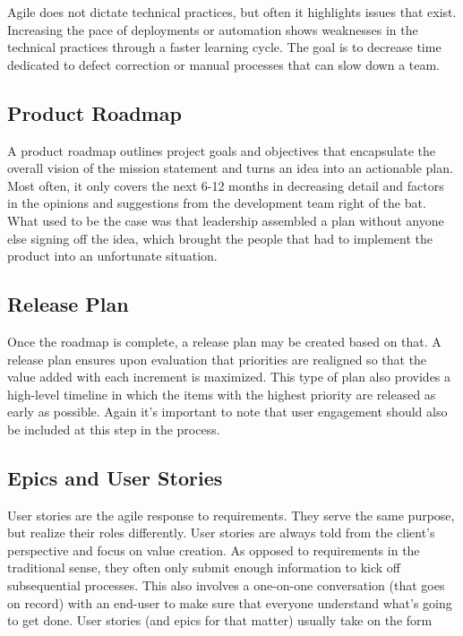 \begin{displaycquote}
	Agile does not dictate technical practices, but often it highlights issues that
	exist. Increasing the pace of deployments or automation shows weaknesses in the
	technical practices through a faster learning cycle. The goal is to decrease time
	dedicated to defect correction or manual processes that can slow down a team.
\end{displaycquote}

\subsection{Product Roadmap}\label{agile-product-roadmap}

\begin{flushleft}
	A product roadmap outlines project goals and objectives that encapsulate the
	overall vision of the mission statement and turns an idea into an actionable
	plan. Most often, it only covers the next 6-12 months in decreasing detail and
	factors in the opinions and suggestions from the development team right of the
	bat. What used to be the case was that leadership assembled a plan without anyone
	else signing off the idea, which brought the people that had to implement the
	product into an unfortunate situation.
\end{flushleft}

\subsection{Release Plan}\label{agile-release-plan}

\begin{flushleft}
	Once the roadmap is complete, a release plan may be created based on that. A
	release plan ensures upon evaluation that priorities are realigned so that the
	value added with each increment is maximized. This type of plan also provides
	a high-level timeline in which the items with the highest priority are released
	as early as possible. Again it's important to note that user engagement should
	also be included at this step in the process.
\end{flushleft}

\subsection{Epics and User Stories}\label{agile-epics-and-user-stories}

\begin{flushleft}
	User stories are the agile response to requirements. They serve the same purpose,
	but realize their roles differently. User stories are always told from the client's
	perspective and focus on value creation. As opposed to requirements in the traditional
	sense, they often only submit enough information to kick off subsequential processes.
	This also involves a one-on-one conversation (that goes on record) with an end-user
	to make sure that everyone understand what's going to get done. User stories (and
	epics for that matter) usually take on the form
\end{flushleft}


